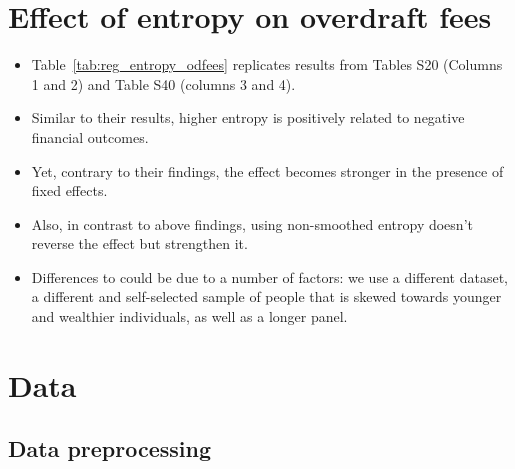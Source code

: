 
\section{Effect of entropy on overdraft fees}%
\label{sub:effect_of_entropy_on_overdraft_fees}

\begin{itemize}

    \item Table~\ref{tab:reg_entropy_odfees} replicates results from
        \citet{muggleton2020evidence} Tables S20 (Columns 1 and 2) and Table
        S40 (columns 3 and 4).

    \item Similar to their results, higher entropy is positively related to
        negative financial outcomes.

    \item Yet, contrary to their findings, the effect becomes stronger in the
        presence of fixed effects.

    \item Also, in contrast to above findings, using non-smoothed entropy
        doesn't reverse the effect but strengthen it.

    \item Differences to \citet{muggleton2020evidence} could be due to a number
        of factors: we use a different dataset, a different and self-selected sample of people
        that is skewed towards younger and wealthier individuals, as well as a
        longer panel.

\end{itemize}





\section{Data}%
\label{sec:data}

\subsection{Data preprocessing}%
\label{sub:data_preprocessing}

